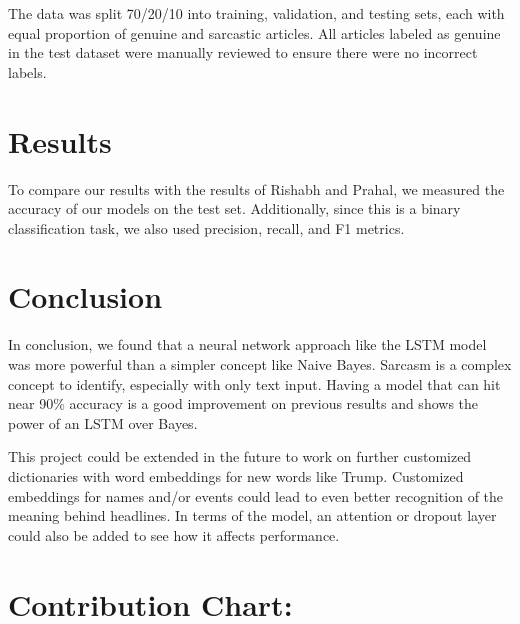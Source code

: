 \documentclass[11pt]{article}
\begin{document}
The data was split 70/20/10 into training, validation, and testing sets, each with equal
proportion of genuine and sarcastic articles. All articles labeled as genuine in the test
dataset were manually reviewed to ensure there were no incorrect labels.


\section{Results}\label{sec:res}

To compare our results with the results of Rishabh and Prahal,
we measured the accuracy of our models on the test set. \cite{misra2023Sarcasm}
Additionally, since this is a binary classification task,
we also used precision, recall, and F1 metrics.




\section{Conclusion}

In conclusion, we found that a neural network approach like the LSTM model was more powerful than a simpler concept like Naive Bayes. Sarcasm is a complex concept to identify, especially with only text input. Having a model that can hit near 90\% accuracy is a good improvement on previous results and shows the power of an LSTM over Bayes.

This project could be extended in the future to work on further customized dictionaries with word embeddings for new words like Trump. Customized embeddings for names and/or events could lead to even better recognition of the meaning behind headlines. In terms of the model, an attention or dropout layer could also be added to see how it affects performance.

\section{Contribution Chart:}
\end{document}
